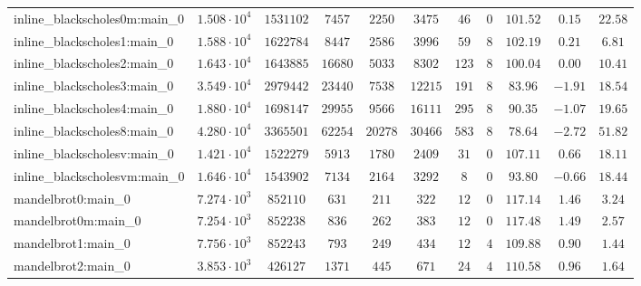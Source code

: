 \begin{tabular}{|l|c|c|c|c|c|c|c|c|c|c|}
inline\_blackscholes0m:main\_0 & $ 1.508 \cdot 10^{4} $ & $ 1531102  $ & $ 7457   $ & $ 2250   $ & $ 3475   $ & $ 46   $ & $ 0    $ & $ 101.52      $ & $ 0.15    $ & $ 22.58   $ \\
inline\_blackscholes1:main\_0  & $ 1.588 \cdot 10^{4} $ & $ 1622784  $ & $ 8447   $ & $ 2586   $ & $ 3996   $ & $ 59   $ & $ 8    $ & $ 102.19      $ & $ 0.21    $ & $ 6.81    $ \\
inline\_blackscholes2:main\_0  & $ 1.643 \cdot 10^{4} $ & $ 1643885  $ & $ 16680  $ & $ 5033   $ & $ 8302   $ & $ 123  $ & $ 8    $ & $ 100.04      $ & $ 0.00    $ & $ 10.41   $ \\
inline\_blackscholes3:main\_0  & $ 3.549 \cdot 10^{4} $ & $ 2979442  $ & $ 23440  $ & $ 7538   $ & $ 12215  $ & $ 191  $ & $ 8    $ & $ 83.96       $ & $ -1.91   $ & $ 18.54   $ \\
inline\_blackscholes4:main\_0  & $ 1.880 \cdot 10^{4} $ & $ 1698147  $ & $ 29955  $ & $ 9566   $ & $ 16111  $ & $ 295  $ & $ 8    $ & $ 90.35       $ & $ -1.07   $ & $ 19.65   $ \\
inline\_blackscholes8:main\_0  & $ 4.280 \cdot 10^{4} $ & $ 3365501  $ & $ 62254  $ & $ 20278  $ & $ 30466  $ & $ 583  $ & $ 8    $ & $ 78.64       $ & $ -2.72   $ & $ 51.82   $ \\
inline\_blackscholesv:main\_0  & $ 1.421 \cdot 10^{4} $ & $ 1522279  $ & $ 5913   $ & $ 1780   $ & $ 2409   $ & $ 31   $ & $ 0    $ & $ 107.11      $ & $ 0.66    $ & $ 18.11   $ \\
inline\_blackscholesvm:main\_0 & $ 1.646 \cdot 10^{4} $ & $ 1543902  $ & $ 7134   $ & $ 2164   $ & $ 3292   $ & $ 8    $ & $ 0    $ & $ 93.80       $ & $ -0.66   $ & $ 18.44   $ \\
mandelbrot0:main\_0            & $ 7.274 \cdot 10^{3} $ & $ 852110   $ & $ 631    $ & $ 211    $ & $ 322    $ & $ 12   $ & $ 0    $ & $ 117.14      $ & $ 1.46    $ & $ 3.24    $ \\
mandelbrot0m:main\_0           & $ 7.254 \cdot 10^{3} $ & $ 852238   $ & $ 836    $ & $ 262    $ & $ 383    $ & $ 12   $ & $ 0    $ & $ 117.48      $ & $ 1.49    $ & $ 2.57    $ \\
mandelbrot1:main\_0            & $ 7.756 \cdot 10^{3} $ & $ 852243   $ & $ 793    $ & $ 249    $ & $ 434    $ & $ 12   $ & $ 4    $ & $ 109.88      $ & $ 0.90    $ & $ 1.44    $ \\
mandelbrot2:main\_0            & $ 3.853 \cdot 10^{3} $ & $ 426127   $ & $ 1371   $ & $ 445    $ & $ 671    $ & $ 24   $ & $ 4    $ & $ 110.58      $ & $ 0.96    $ & $ 1.64    $ \\

\end{tabular}
